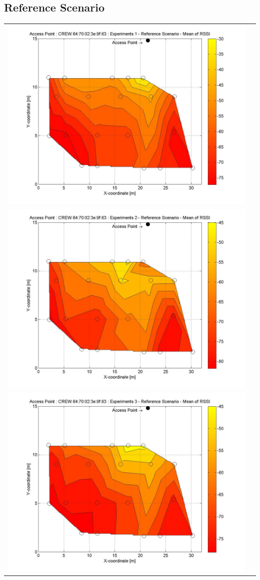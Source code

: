 \documentclass[11pt,a4paper,headinclude,footinclude,chapterprefix=on]{scrreprt}
\begin{document}
\subsection{Reference Scenario} 
\begin{longtable}
	{lr} 
	\includegraphics[width=13cm]{../../Source/plot/CREW_63/63_Ref_Ex_1_Mean.jpg} \\
	\includegraphics[width=13cm]{../../Source/plot/CREW_63/63_Ref_Ex_2_Mean.jpg} \\
	\includegraphics[width=13cm]{../../Source/plot/CREW_63/63_Ref_Ex_3_Mean.jpg} \\

\end{longtable}
\end{document}
